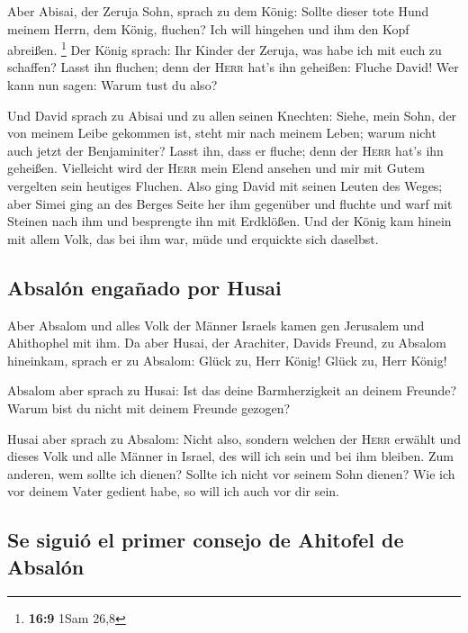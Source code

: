  Aber Abisai, der Zeruja Sohn, sprach zu dem König: Sollte
dieser tote Hund meinem Herrn, dem König, fluchen? Ich will hingehen und
ihm den Kopf abreißen. \footnote{\textbf{16:9} 1Sam 26,8}
 Der König sprach: Ihr Kinder der Zeruja, was habe ich
mit euch zu schaffen? Lasst ihn fluchen; denn der \textsc{Herr} hat's
ihn geheißen: Fluche David! Wer kann nun sagen: Warum tust du also?

 Und David sprach zu Abisai und zu allen seinen Knechten:
Siehe, mein Sohn, der von meinem Leibe gekommen ist, steht mir nach
meinem Leben; warum nicht auch jetzt der Benjaminiter? Lasst ihn, dass
er fluche; denn der \textsc{Herr} hat's ihn geheißen. 
Vielleicht wird der \textsc{Herr} mein Elend ansehen und mir mit Gutem
vergelten sein heutiges Fluchen.  Also ging David mit
seinen Leuten des Weges; aber Simei ging an des Berges Seite her ihm
gegenüber und fluchte und warf mit Steinen nach ihm und besprengte ihn
mit Erdklößen.  Und der König kam hinein mit allem Volk,
das bei ihm war, müde und erquickte sich daselbst.

\hypertarget{absaluxf3n-engauxf1ado-por-husai}{%
\subsection{Absalón engañado por
Husai}\label{absaluxf3n-engauxf1ado-por-husai}}

 Aber Absalom und alles Volk der Männer Israels kamen gen
Jerusalem und Ahithophel mit ihm.  Da aber Husai, der
Arachiter, Davids Freund, zu Absalom hineinkam, sprach er zu Absalom:
Glück zu, Herr König! Glück zu, Herr König!

 Absalom aber sprach zu Husai: Ist das deine
Barmherzigkeit an deinem Freunde? Warum bist du nicht mit deinem Freunde
gezogen?

 Husai aber sprach zu Absalom: Nicht also, sondern
welchen der \textsc{Herr} erwählt und dieses Volk und alle Männer in
Israel, des will ich sein und bei ihm bleiben.  Zum
anderen, wem sollte ich dienen? Sollte ich nicht vor seinem Sohn dienen?
Wie ich vor deinem Vater gedient habe, so will ich auch vor dir sein.

\hypertarget{se-siguiuxf3-el-primer-consejo-de-ahitofel-de-absaluxf3n}{%
\subsection{Se siguió el primer consejo de Ahitofel de
Absalón}\label{se-siguiuxf3-el-primer-consejo-de-ahitofel-de-absaluxf3n}}


